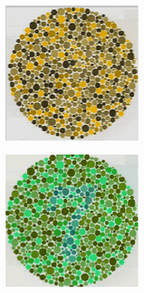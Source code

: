 \documentclass[10pt,twocolumn,letterpaper]{article}
\begin{document}
\begin{figure}[h]
\begin{subfigure}{0.23\textwidth}
    \includegraphics[width=\textwidth]{isihara2.png}
    \caption{}
  \end{subfigure}
  \begin{subfigure}{0.23\textwidth}
    \includegraphics[width=\textwidth]{isihara3.png}

\end{subfigure}
\end{figure}
\end{document}
